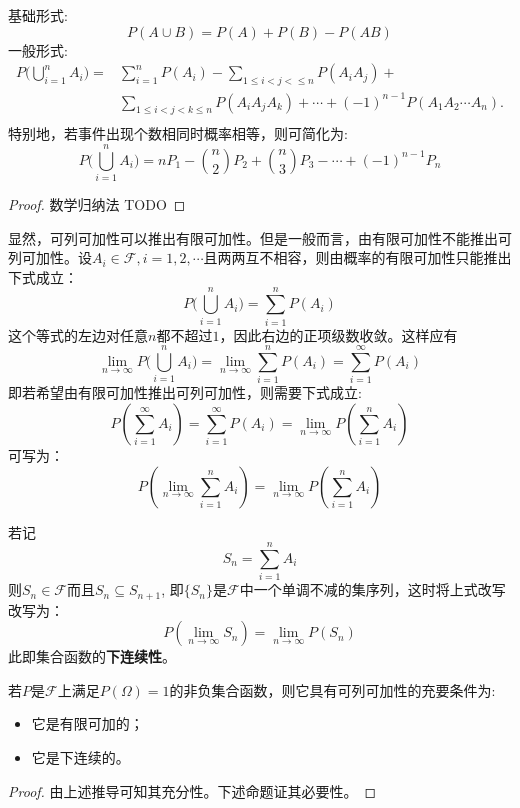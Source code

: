\begin{proposition}[加法公式]\label{pro:addition_law}
    基础形式:
    \[ P(A \cup B) = P(A) + P(B) - P(AB) \]
    一般形式:
    \begin{align*}
        P\biggl(\bigcup_{i=1}^n A_i \biggr)= & \sum_{i=1}^n P(A_i) - \sum_{1\le i < j < \le n}P(A_i A_j)+                              \\
                                             & \sum_{1 \le i < j < k \le n} P(A_i A_j A_k)+ \dotsb + (-1)^{n-1} P(A_1 A_2 \dotsb A_n). \\
    \end{align*}
    特别地，若事件出现个数相同时概率相等，则可简化为:
    \[ P\biggl( \bigcup_{i=1}^n A_i \biggr)=n P_{1} - \binom{n}{2} P_{2} + \binom{n}{3} P_{3}- \cdots+(-1)^{n-1} P_{n} \]
\end{proposition}
\begin{proof}
    数学归纳法
    TODO
\end{proof}

显然，可列可加性可以推出有限可加性。但是一般而言，由有限可加性不能推出可列可加性。设$A_i \in \mathscr{F}, i=1,2,\cdots$且两两互不相容，则由概率的有限可加性只能推出下式成立：
\[ P\biggl( \bigcup_{i=1}^n A_i \biggr)=\sum_{i=1}^n P(A_i) \]
这个等式的左边对任意$n$都不超过$1$，因此右边的正项级数收敛。这样应有
\[ \lim_{n \to \infty}P\biggl(\bigcup_{i=1}^n A_i \biggr) =\lim_{n \to \infty}\sum_{i=1}^n P(A_i)=\sum_{i=1}^{\infty} P(A_i) \]
即若希望由有限可加性推出可列可加性，则需要下式成立:
\[ P(\sum_{i=1}^{\infty} A_i)=\sum_{i=1}^{\infty} P(A_i)=\lim_{n \to \infty}P(\sum_{i=1}^n A_i) \]
可写为：
\[ P(\lim_{n \to \infty}\sum_{i=1}^{n} A_i)=\lim_{n \to \infty}P(\sum_{i=1}^n A_i) \]

若记
\[ S_n=\sum_{i=1}^n A_i \]
则$S_n \in \mathscr{F}$而且$S_n \subseteq S_{n+1}$, 即$\{ S_n \}$是$\mathscr{F}$中一个单调不减的集序列，这时将上式改写改写为：
\[ P(\lim_{n \to \infty}S_n)=\lim_{n \to \infty}P(S_n) \]
此即集合函数的\textbf{下连续性}。

\begin{theorem}[可列可加的充要条件]
    若$P$是$\mathscr{F}$上满足$P(\Omega)=1$的非负集合函数，则它具有可列可加性的充要条件为:
    \begin{itemize}
        \item 它是有限可加的；
        \item 它是下连续的。
    \end{itemize}
\end{theorem}
\begin{proof}
    由上述推导可知其充分性。下述命题证其必要性。
\end{proof}

